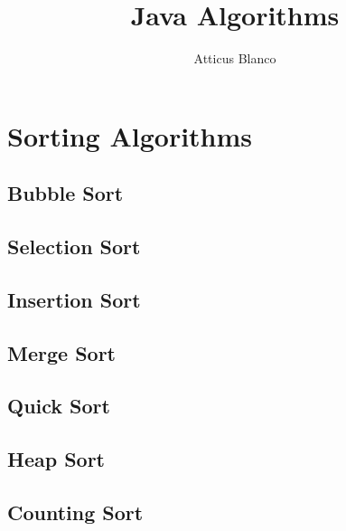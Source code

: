 \documentclass[11pt]{article}
\begin{document}
\title{Java Algorithms}
\author{Atticus Blanco}

\maketitle

    \clearpage

\tableofcontents

    \section{Sorting Algorithms}\label{sec:sorting-algorithms}

    \clearpage

\subsection{Bubble Sort}
            

        \subsection{Selection Sort}
            

        \subsection{Insertion Sort}
            

        \subsection{Merge Sort}
            

        \subsection{Quick Sort}
            

        \subsection{Heap Sort}
            

        \subsection{Counting Sort}
            
\end{document}
